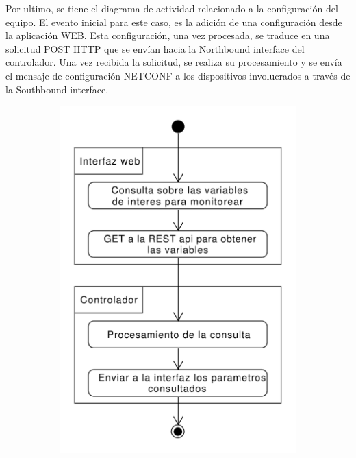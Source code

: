 Por ultimo, se tiene el diagrama de actividad relacionado a la configuración del equipo. El evento inicial para este caso, es la adición de una configuración desde la aplicación WEB. Esta configuración, una vez procesada, se traduce en una solicitud POST HTTP que se envían hacia la Northbound interface del controlador. Una vez recibida la solicitud, se realiza su procesamiento y se envía el mensaje de configuración NETCONF a los dispositivos involucrados a través de la Southbound interface.


  


  \begin{figure}[!h]
    \centering
    \begin{subfigure}[b]{0.43\textwidth}
        \centering
        \includegraphics[width=\textwidth]{Figures/actividad_monitoreo.pdf}

\end{subfigure}
\end{figure}
